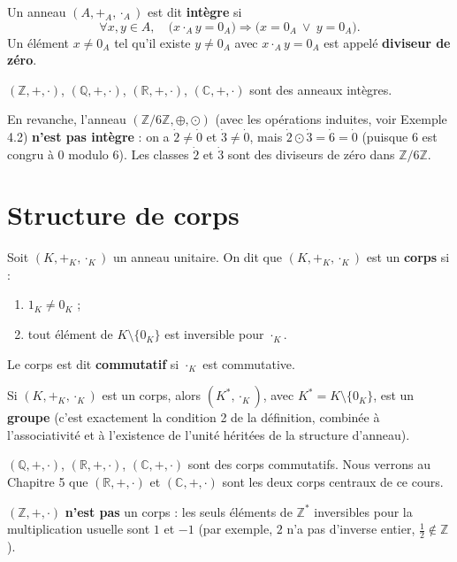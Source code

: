 \documentclass[a4paper,12pt,openany]{book}
\begin{document}
\begin{definition}[4.7]
Un anneau $(A,+_A,\cdot_A)$ est dit \textbf{intègre} si
\[
\forall x,y\in A,\quad \big(x\cdot_A y = 0_A\big) \Rightarrow
\big(x=0_A \ \vee\ y=0_A\big).
\]
Un élément $x\neq0_A$ tel qu'il existe $y\neq0_A$ avec $x\cdot_Ay=0_A$ est
appelé \textbf{diviseur de zéro}.
\end{definition}

\begin{exemple}[4.8]
$(\mathbb{Z},+,\cdot)$, $(\mathbb{Q},+,\cdot)$, $(\mathbb{R},+,\cdot)$,
$(\mathbb{C},+,\cdot)$ sont des anneaux intègres.

En revanche, l'anneau $(\mathbb{Z}/6\mathbb{Z}, \oplus,\odot)$ (avec les
opérations induites, voir Exemple 4.2) \textbf{n'est pas intègre} : on a
$\dot 2 \neq \dot 0$ et $\dot 3 \neq \dot 0$, mais $\dot 2 \odot \dot 3 =
\dot 6 = \dot 0$ (puisque $6$ est congru à $0$ modulo $6$). Les classes
$\dot 2$ et $\dot 3$ sont des diviseurs de zéro dans
$\mathbb{Z}/6\mathbb{Z}$.
\end{exemple}

\section{Structure de corps}


\begin{definition}[4.8]
Soit $(K,+_K,\cdot_K)$ un anneau unitaire. On dit que $(K,+_K,\cdot_K)$ est
un \textbf{corps} si :
\begin{enumerate}
  \item $1_K \neq 0_K$ ;
  \item tout élément de $K\setminus\{0_K\}$ est inversible pour $\cdot_K$.
\end{enumerate}
Le corps est dit \textbf{commutatif} si $\cdot_K$ est commutative.
\end{definition}

\begin{remarque}
Si $(K,+_K,\cdot_K)$ est un corps, alors $(K^*,\cdot_K)$, avec
$K^*=K\setminus\{0_K\}$, est un \textbf{groupe} (c'est exactement la
condition 2 de la définition, combinée à l'associativité et à l'existence
de l'unité héritées de la structure d'anneau).
\end{remarque}

\begin{exemple}[4.9]
$(\mathbb{Q},+,\cdot)$, $(\mathbb{R},+,\cdot)$, $(\mathbb{C},+,\cdot)$ sont
des corps commutatifs. Nous verrons au Chapitre 5 que $(\mathbb{R},+,\cdot)$
et $(\mathbb{C},+,\cdot)$ sont les deux corps centraux de ce cours.

$(\mathbb{Z},+,\cdot)$ \textbf{n'est pas} un corps : les seuls éléments de
$\mathbb{Z}^*$ inversibles pour la multiplication usuelle sont $1$ et
$-1$ (par exemple, $2$ n'a pas d'inverse entier, $\frac12\notin
\mathbb{Z}$).
\end{exemple}
\end{document}

